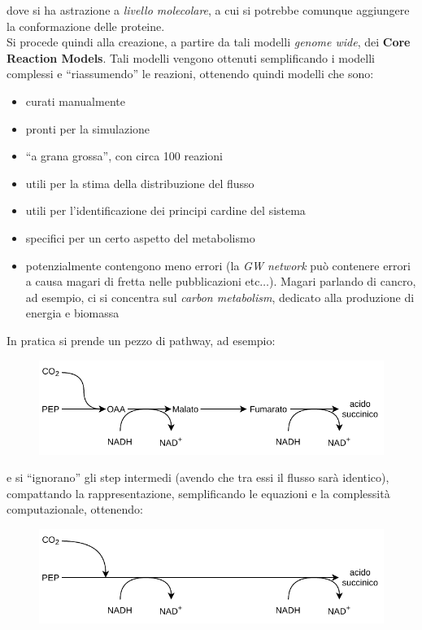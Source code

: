 \documentclass[a4paper,12pt, oneside]{book}
\begin{document}
dove si ha astrazione a \textit{livello molecolare}, a cui si
potrebbe comunque aggiungere la conformazione delle proteine.  \\
Si procede quindi alla creazione, a partire da tali modelli \textit{genome
  wide}, dei 
\textbf{Core Reaction Models}. Tali modelli vengono ottenuti semplificando i
modelli complessi e ``riassumendo'' le reazioni, ottenendo quindi modelli che
sono: 
\begin{itemize}
  \item curati manualmente
  \item pronti per la simulazione
  \item ``a grana grossa'', con circa 100 reazioni
  \item utili per la stima della distribuzione del flusso
  \item utili per l'identificazione dei principi cardine del sistema
  \item specifici per un certo aspetto del metabolismo
  \item potenzialmente contengono meno errori (la \textit{GW network} può
  contenere errori a causa magari di fretta nelle pubblicazioni
  etc$\ldots$). Magari parlando di cancro, ad esempio, ci si concentra sul
  \textit{carbon metabolism}, dedicato alla produzione di energia e biomassa
\end{itemize}
In pratica si prende un pezzo di pathway, ad esempio:
\begin{figure}[H]
  \centering
  \includegraphics[scale = 0.85]{img/lr1.pdf}
\end{figure}
e si ``ignorano'' gli step intermedi (avendo che tra essi il flusso sarà
identico), compattando la rappresentazione, 
semplificando le equazioni e la complessità computazionale, ottenendo:
\begin{figure}[H]
  \centering
  \includegraphics[scale = 0.85]{img/lr2.pdf}
\end{figure}
\end{document}
